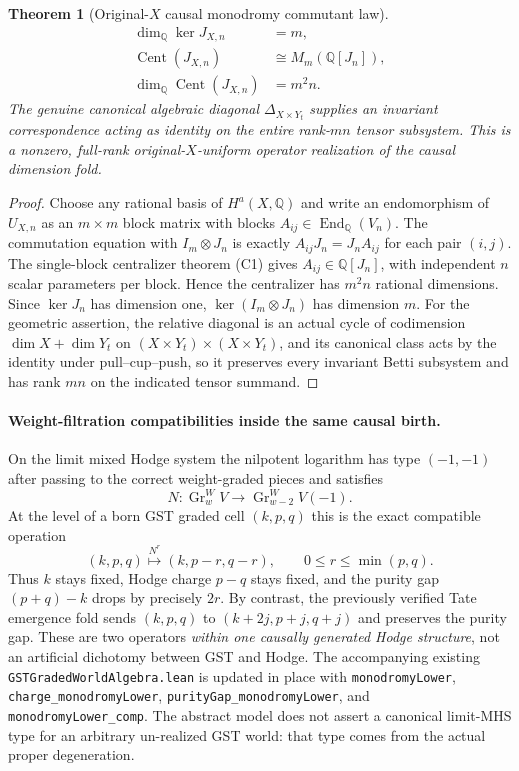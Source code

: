 \documentclass[11pt]{article}
\newtheorem{theorem}{Theorem}
\begin{document}
\begin{theorem}[Original-$X$ causal monodromy commutant law]
\[
\boxed{
\begin{aligned}
\dim_{\mathbb Q}\ker J_{X,n} &=m,\\
\operatorname{Cent}(J_{X,n})
   &\cong M_m(\mathbb Q[J_n]),\\
\dim_{\mathbb Q}\operatorname{Cent}(J_{X,n})
   &=m^2n.
\end{aligned}
}\tag{C4}
\]
The genuine canonical algebraic diagonal
$\Delta_{X\times Y_t}$ supplies an invariant
correspondence acting as identity on the \emph{entire}
rank-$mn$ tensor subsystem. This is a nonzero,
full-rank original-$X$-uniform \emph{operator}
realization of the causal dimension fold.
\end{theorem}
\begin{proof}
Choose any rational basis of $H^a(X,\mathbb Q)$
and write an endomorphism of $U_{X,n}$
as an $m\times m$ block matrix with blocks
$A_{ij}\in\operatorname{End}_{\mathbb Q}(V_n)$.
The commutation equation with
$I_m\otimes J_n$ is exactly
$A_{ij}J_n=J_nA_{ij}$ for each pair $(i,j)$.
The single-block centralizer theorem (C1) gives
$A_{ij}\in\mathbb Q[J_n]$, with independent
$n$ scalar parameters per block. Hence the
centralizer has $m^2n$ rational dimensions.
Since $\ker J_n$ has dimension one,
$\ker (I_m\otimes J_n)$ has dimension $m$.
For the geometric assertion, the relative
diagonal is an actual cycle of codimension
$\dim X+\dim Y_t$ on
$(X\times Y_t)\times(X\times Y_t)$,
and its canonical class acts by the identity
under pull--cup--push, so it preserves
every invariant Betti subsystem and has rank $mn$
on the indicated tensor summand.
\end{proof}

\paragraph{Weight-filtration compatibilities inside the same causal birth.}
On the limit mixed Hodge system the nilpotent
logarithm has type $(-1,-1)$ after passing to the
correct weight-graded pieces and satisfies
\[
N:\operatorname{Gr}^{W}_{w}V
 \longrightarrow\operatorname{Gr}^{W}_{w-2}V(-1).
\tag{C5}
\]
At the level of a born GST graded cell
$(k,p,q)$ this is the exact compatible operation
\[
(k,p,q)\stackrel{N^r}{\longmapsto}(k,p-r,q-r),
\qquad 0\le r\le\min(p,q).
\tag{C6}
\]
Thus $k$ stays fixed, Hodge charge $p-q$ stays
fixed, and the purity gap
$(p+q)-k$ drops by precisely $2r$.
By contrast, the previously verified Tate
emergence fold sends $(k,p,q)$ to
$(k+2j,p+j,q+j)$ and preserves the purity gap.
These are two operators \emph{within one
causally generated Hodge structure}, not an
artificial dichotomy between GST and Hodge.
The accompanying existing
\texttt{GSTGradedWorldAlgebra.lean} is updated
in place with \texttt{monodromyLower},
\texttt{charge\_monodromyLower},
\texttt{purityGap\_monodromyLower}, and
\texttt{monodromyLower\_comp}.
The abstract model does not assert a canonical
limit-MHS type for an arbitrary un-realized GST world:
that type comes from the actual proper degeneration.
\end{document}

